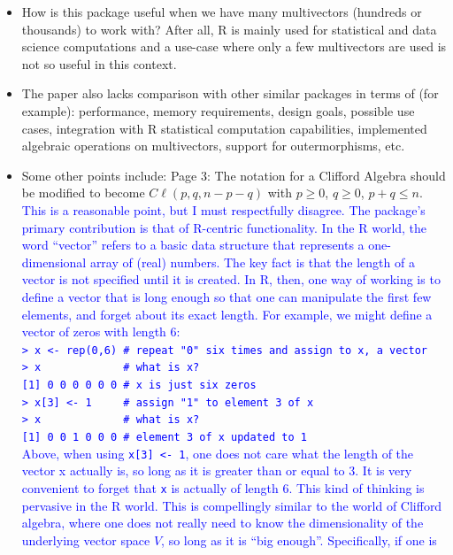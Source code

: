 \documentclass{article}
\newcommand{\cliff}[1]{\ensuremath{C\ell\left(#1\right)}}
\begin{document}
\begin{itemize}
\item How is this package useful when we have many multivectors
  (hundreds or thousands) to work with? After all, R is mainly used
  for statistical and data science computations and a use-case where
  only a few multivectors are used is not so useful in this context.
\item The paper also lacks comparison with other similar packages in
  terms of (for example): performance, memory requirements, design
  goals, possible use cases, integration with R statistical
  computation capabilities, implemented algebraic operations on
  multivectors, support for outermorphisms, etc.
\item Some other points include: Page 3: The notation for a Clifford
  Algebra should be modified to become $\cliff{p,q,n-p-q}$ with $p\geq
  0$, $q\geq 0$, $p+q\leq n$.
\textcolor{blue}{This is a reasonable point, but I must respectfully
  disagree.  The package's primary contribution is that of R-centric
  functionality.  In the R world, the word ``vector'' refers to a
  basic data structure that represents a one-dimensional array of
  (real) numbers.  The key fact is that the length of a vector is not
  specified until it is created.  In R, then, one way of working is to
  define a vector that is long enough so that one can manipulate the
  first few elements, and forget about its exact length.  For example,
  we might define a vector of zeros with length 6:\\[20pt]
  {\tt > x <- rep(0,6)   \# repeat "0" six times and assign to x, a vector}\\
  {\tt > x\ \ \ \ \ \ \ \ \ \ \ \ \ \# what is x?}\\
  {\tt [1] 0 0 0 0 0 0\ \# x is just six zeros}\\
  {\tt > x[3] <- 1\ \ \ \ \ \# assign "1" to element 3 of x}\\
  {\tt > x\ \ \ \ \ \ \ \ \ \ \ \ \ \# what is x?}\\
  {\tt [1] 0 0 1 0 0 0\ \# element 3 of x updated to 1}\\[20pt]
Above, when using {\tt x[3] <- 1}, one does not care what the length
of the vector x actually is, so long as it is greater than or equal to
3.  It is very convenient to forget that {\tt x} is actually of length
6. This kind of thinking is pervasive in the R world.  This is
compellingly similar to the world of Clifford algebra, where one does
not really need to know the dimensionality of the underlying vector
space $V$, so long as it is ``big enough''.  Specifically, if one is
}
\end{itemize}
\end{document}
